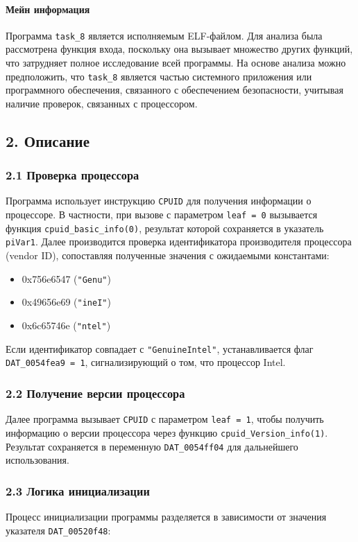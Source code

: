 \paragraph{Мейн информация}
Программа \texttt{task\_8} является исполняемым ELF-файлом.
Для анализа была рассмотрена функция входа, поскольку она вызывает множество других функций,
что затрудняет полное исследование всей программы.
На основе анализа можно предположить, что
\texttt{task\_8} является частью системного приложения или программного обеспечения,
связанного с обеспечением безопасности, учитывая наличие проверок, связанных с процессором.

\subsection*{2. Описание}
\subsubsection*{2.1 Проверка процессора}
Программа использует инструкцию \texttt{CPUID} для получения информации о процессоре.
В частности, при вызове с параметром \texttt{leaf = 0} вызывается функция \texttt{cpuid\_basic\_info(0)},
результат которой сохраняется в указатель \texttt{piVar1}.
Далее производится проверка идентификатора производителя процессора (vendor ID),
сопоставляя полученные значения с ожидаемыми константами:

\begin{itemize}
    \item 0x756e6547 (\texttt{"Genu"})
    \item 0x49656e69 (\texttt{"ineI"})
    \item 0x6c65746e (\texttt{"ntel"})
\end{itemize}

Если идентификатор совпадает с \texttt{"GenuineIntel"},
устанавливается флаг \texttt{DAT\_0054fea9 = 1}, сигнализирующий о том, что процессор Intel.

\subsubsection*{2.2 Получение версии процессора}
Далее программа вызывает \texttt{CPUID} с параметром \texttt{leaf = 1},
чтобы получить информацию о версии процессора через функцию \texttt{cpuid\_Version\_info(1)}.
Результат сохраняется в переменную \texttt{DAT\_0054ff04} для дальнейшего использования.

\subsubsection*{2.3 Логика инициализации}
Процесс инициализации программы разделяется в зависимости от значения указателя \texttt{DAT\_00520f48}:


